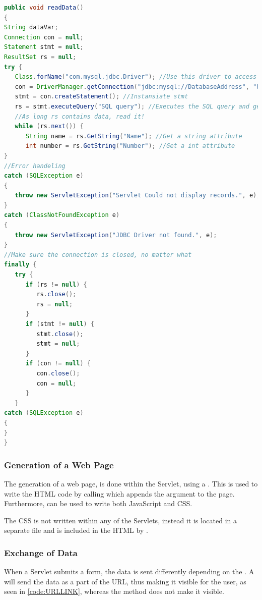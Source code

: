\begin{lstlisting}[language=Java,label=code:readDatabase,caption=Code to read data from the database]
public void readData()
{
String dataVar;
Connection con = null;
Statement stmt = null;
ResultSet rs = null;
try {
   Class.forName("com.mysql.jdbc.Driver"); //Use this driver to access the database
   con = DriverManager.getConnection("jdbc:mysql://DatabaseAddress", "Username", "Password"); //Instansiate the connection
   stmt = con.createStatement(); //Instansiate stmt
   rs = stmt.executeQuery("SQL query"); //Executes the SQL query and get the result store in RS
   //As long rs contains data, read it!
   while (rs.next()) { 
      String name = rs.GetString("Name"); //Get a string attribute
      int number = rs.GetString("Number"); //Get a int attribute
}
//Error handeling
catch (SQLException e) 
{		
   throw new ServletException("Servlet Could not display records.", e);
} 
catch (ClassNotFoundException e) 
{			
   throw new ServletException("JDBC Driver not found.", e);
}
//Make sure the connection is closed, no matter what 
finally {
   try {
      if (rs != null) {
         rs.close();
         rs = null;
      }
      if (stmt != null) {
         stmt.close();
         stmt = null;
      }
      if (con != null) {
         con.close();
         con = null;
      }
   } 
catch (SQLException e) 
{			
}
}

\end{lstlisting}

\subsubsection{Generation of a Web Page}
The generation of a web page, is done within the Servlet, using a . This is used to write the HTML code by calling  which appends the argument to the page. Furthermore,  can be used to write both JavaScript and CSS.

The CSS is not written within any of the Servlets, instead it is located in a separate file and is included in the HTML by .

\subsubsection{Exchange of Data}
When a Servlet submits a form, the data is sent differently depending on the . A  will send the data as a part of the URL, thus making it visible for the user, as seen in \autoref{code:URLLINK}, whereas the  method does not make it visible.


